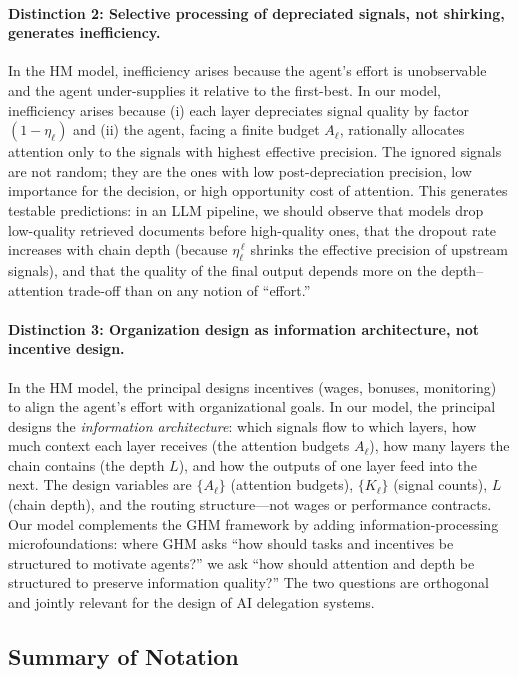 \paragraph{Distinction 2: Selective processing of depreciated signals, not shirking, generates inefficiency.} In the HM model, inefficiency arises because the agent's effort is unobservable and the agent under-supplies it relative to the first-best. In our model, inefficiency arises because (i) each layer depreciates signal quality by factor $(1-\eta_\ell)$ and (ii) the agent, facing a finite budget $A_\ell$, rationally allocates attention only to the signals with highest effective precision. The ignored signals are not random; they are the ones with low post-depreciation precision, low importance for the decision, or high opportunity cost of attention. This generates testable predictions: in an LLM pipeline, we should observe that models drop low-quality retrieved documents before high-quality ones, that the dropout rate increases with chain depth (because $\eta_\ell^{\,\ell}$ shrinks the effective precision of upstream signals), and that the quality of the final output depends more on the depth--attention trade-off than on any notion of ``effort.''

\paragraph{Distinction 3: Organization design as information architecture, not incentive design.} In the HM model, the principal designs incentives (wages, bonuses, monitoring) to align the agent's effort with organizational goals. In our model, the principal designs the \emph{information architecture}: which signals flow to which layers, how much context each layer receives (the attention budgets $A_\ell$), how many layers the chain contains (the depth $L$), and how the outputs of one layer feed into the next. The design variables are $\{A_\ell\}$ (attention budgets), $\{K_\ell\}$ (signal counts), $L$ (chain depth), and the routing structure---not wages or performance contracts. Our model complements the GHM framework by adding information-processing microfoundations: where GHM asks ``how should tasks and incentives be structured to motivate agents?'' we ask ``how should attention and depth be structured to preserve information quality?'' The two questions are orthogonal and jointly relevant for the design of AI delegation systems.

\subsection{Summary of Notation}
\label{subsec:notation}


